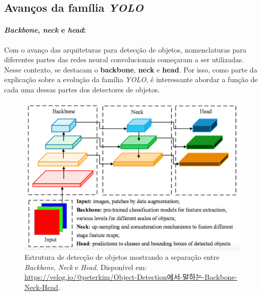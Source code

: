 \subsection{Avanços da família \emph{YOLO}}
\paragraph{\emph{Backbone}, \emph{neck} e \emph{head}:}
Com o avanço das arquiteturas para detecção de objetos, nomenclaturas para diferentes partes das redes neural convolucionais começaram a ser 
utilizadas. Nesse contexto, se destacam o {\bf backbone}, {\bf neck} e {\bf head}. Por isso, como parte da explicação sobre a evolução da família \emph{YOLO}, é interessante abordar a função de cada uma dessas partes dos detectores de objetos.

\begin{figure}[htb!]
    \centering
    \includegraphics[width=0.8\linewidth]{images/backbone-neck-head.png}
    \caption{\label{fig:backbone_neck_head} Estrutura de detecção de objetos mostrando a separação entre \emph{Backbone}, \emph{Neck} e \emph{Head}. Disponível em: \url{https://velog.io/@peterkim/Object-Detection에서-말하는-Backbone-Neck-Head}.}
\end{figure}


